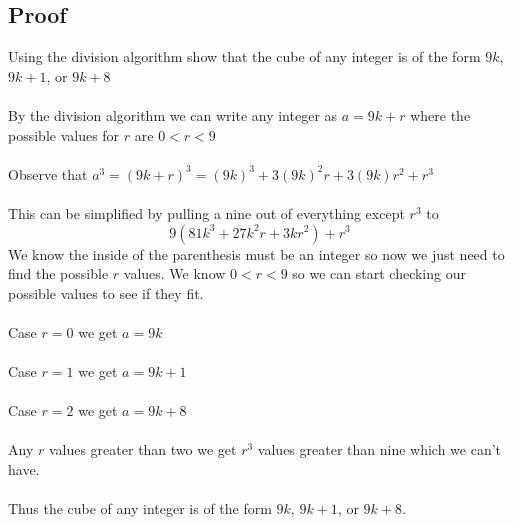 \documentclass{article}
\begin{document}
\subsection{Proof}
Using the division algorithm show that the cube of any integer is of the form $9k$, $9k+1$, or $9k+8$\\\\
By the division algorithm we can write any integer as $a = 9k + r$ where the possible values for $r$ are $0 < r < 9$\\\\
Observe that $a^3 = (9k + r)^3 = (9k)^3 + 3(9k)^2r + 3(9k)r^2 + r^3$\\\\
This can be simplified by pulling a nine out of everything except $r^3$ to $$9(81k^3+27k^2r+3kr^2) + r^3$$
We know the inside of the parenthesis must be an integer so now we just need to find the possible $r$ values. We know $0 < r < 9$ so we can start checking our possible values to see if they fit. 
\\\\
Case $r=0$ we get $a=9k$
\\\\
Case $r=1$ we get $a=9k+1$
\\\\
Case $r=2$ we get $a=9k+8$
\\\\
Any $r$ values greater than two we get $r^3$ values greater than nine which we can't have.
\\\\
Thus the cube of any integer is of the form $9k$, $9k+1$, or $9k+8$.
\end{document}

